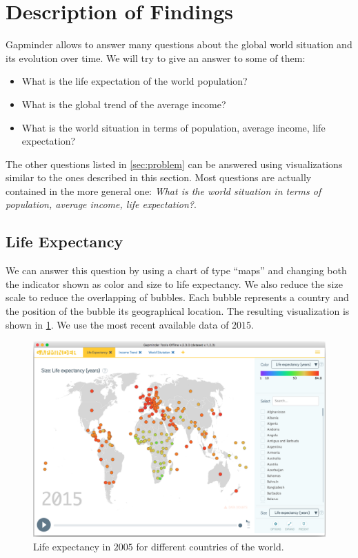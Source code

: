 \section{Description of Findings}
\label{sec:findings}

Gapminder allows to answer many questions about the global world situation and its evolution over time.
We will try to give an answer to some of them:
\begin{itemize}
    \item What is the life expectation of the world population?
    \item What is the global trend of the average income?    
    \item What is the world situation in terms of population, average income, life expectation?
\end{itemize}

The other questions listed in \cref{sec:problem} can be answered using visualizations similar to the ones described in this section.
Most questions are actually contained in the more general one: \textit{What is the world situation in terms of population, average income, life expectation?}.

\subsection{Life Expectancy}
We can answer this question by using a chart of type ``maps'' and changing both the indicator shown as color and size to life expectancy.
We also reduce the size scale to reduce the overlapping of bubbles.
Each bubble represents a country and the position of the bubble its geographical location.
The resulting visualization is shown in \cref{fig:life-expectation}.
We use the most recent available data of $2015$.

\begin{figure}[h]
	\centering
	\includegraphics[width=0.95\columnwidth]{figures/life-expectancy}
	\caption{Life expectancy in $2005$ for different countries of the world.}
	\label{fig:life-expectation}
\end{figure}


